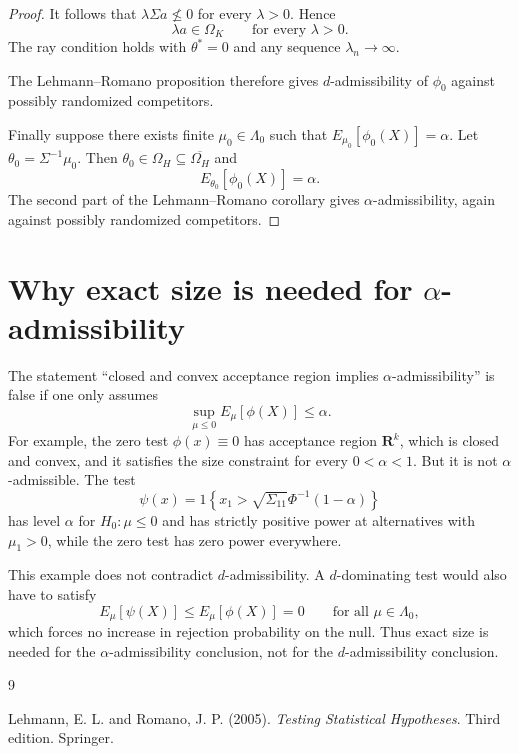 \documentclass[11pt]{article}
\begin{document}
\begin{proof}
It follows that $\lambda\Sigma a\not\le 0$ for every $\lambda>0$. Hence
\[
\lambda a\in\Omega_K
\qquad\text{for every }\lambda>0.
\]
The ray condition holds with $\theta^*=0$ and any sequence $\lambda_n\to\infty$.

The Lehmann--Romano proposition therefore gives $d$-admissibility of $\phi_0$ against possibly randomized competitors.

Finally suppose there exists finite $\mu_0\in\Lambda_0$ such that $E_{\mu_0}[\phi_0(X)]=\alpha$. Let $\theta_0=\Sigma^{-1}\mu_0$. Then $\theta_0\in\Omega_H\subseteq\overline{\Omega_H}$ and
\[
E_{\theta_0}[\phi_0(X)]=\alpha.
\]
The second part of the Lehmann--Romano corollary gives $\alpha$-admissibility, again against possibly randomized competitors.
\end{proof}

\section{Why exact size is needed for $\alpha$-admissibility}

The statement ``closed and convex acceptance region implies $\alpha$-admissibility'' is false if one only assumes
\[
\sup_{\mu\le 0}E_\mu[\phi(X)]\le \alpha.
\]
For example, the zero test $\phi(x)\equiv 0$ has acceptance region $\mathbf R^k$, which is closed and convex, and it satisfies the size constraint for every $0<\alpha<1$. But it is not $\alpha$-admissible. The test
\[
\psi(x)=1\left\{x_1>\sqrt{\Sigma_{11}}\Phi^{-1}(1-\alpha)\right\}
\]
has level $\alpha$ for $H_0:\mu\le 0$ and has strictly positive power at alternatives with $\mu_1>0$, while the zero test has zero power everywhere.

This example does not contradict $d$-admissibility. A $d$-dominating test would also have to satisfy
\[
E_\mu[\psi(X)]\le E_\mu[\phi(X)]=0
\qquad\text{for all }\mu\in\Lambda_0,
\]
which forces no increase in rejection probability on the null. Thus exact size is needed for the $\alpha$-admissibility conclusion, not for the $d$-admissibility conclusion.

\begin{thebibliography}{9}

Lehmann, E. L. and Romano, J. P. (2005).
\textit{Testing Statistical Hypotheses}.
Third edition. Springer.

\end{thebibliography}
\end{document}
